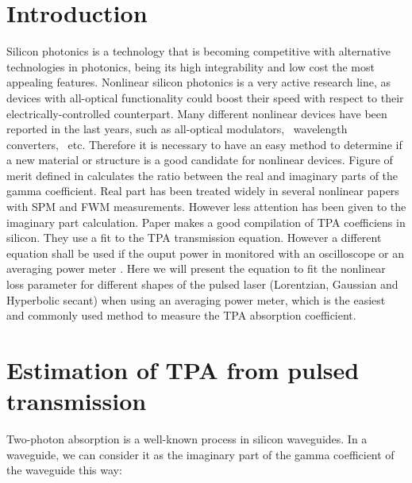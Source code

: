 \documentclass[10pt,letterpaper]{article}
\begin{document}
\section{Introduction}
Silicon photonics is a technology that is becoming competitive with alternative technologies in photonics, being its high integrability and low cost the most appealing features. Nonlinear silicon photonics is a very active research line, as devices with all-optical functionality could boost their speed with respect to their electrically-controlled counterpart. Many different nonlinear devices have been reported in the last years, such as all-optical modulators,~\cite{Almeida2004a} wavelength converters,~\cite{Lee2009} etc. Therefore it is necessary to have an easy method to determine if a new material or structure is a good candidate for nonlinear devices. Figure of merit defined in \cite{Koos2007} calculates the ratio between the real and imaginary parts of the gamma coefficient. Real part has been treated widely in several nonlinear papers with SPM and FWM measurements. However less attention has been given to the imaginary part calculation.
Paper \cite{Tsang2008} makes a good compilation of TPA coefficiens in silicon. They use a fit to the TPA transmission equation. However a different equation shall be used if the ouput power in monitored with an oscilloscope \cite{Mcgroddy1978} or an averaging power meter \cite{Tsang2008,Tsang1991,Vallaitis2009,Kuyken2011}. Here we will present the equation to fit the nonlinear loss parameter for different shapes of the pulsed laser (Lorentzian, Gaussian and Hyperbolic secant) when using an averaging power meter, which is the easiest and commonly used method to measure the TPA absorption coefficient.




\section{Estimation of TPA from pulsed transmission}
Two-photon absorption is a well-known process in silicon waveguides. In a waveguide, we can consider it as the imaginary part of the gamma coefficient of the waveguide this way:
\end{document}
